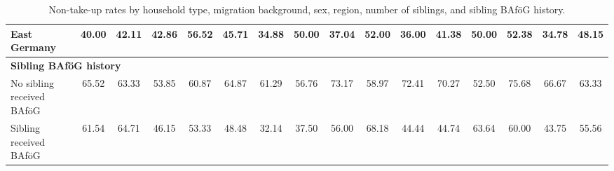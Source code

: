 \begin{landscape}
\begin{table}[H]
\begin{tabular}{lccccccccccccccc}
East Germany & 40.00 & 42.11 & 42.86 & 56.52 & 45.71 & 34.88 & 50.00 & 37.04 & 52.00 & 36.00 & 41.38 & 50.00 & 52.38 & 34.78 & 48.15 \\
\midrule
\multicolumn{16}{l}{\textbf{Sibling BAföG history}} \\
No sibling received BAföG & 65.52 & 63.33 & 53.85 & 60.87 & 64.87 & 61.29 & 56.76 & 73.17 & 58.97 & 72.41 & 70.27 & 52.50 & 75.68 & 66.67 & 63.33 \\
Sibling received BAföG    & 61.54 & 64.71 & 46.15 & 53.33 & 48.48 & 32.14 & 37.50 & 56.00 & 68.18 & 44.44 & 44.74 & 63.64 & 60.00 & 43.75 & 55.56 \\
\bottomrule
\end{tabular}
\caption{Non-take-up rates by household type, migration background, sex, region, number of siblings, and sibling BAföG history.}
\label{table:take-up-rates-grouped}
\end{table}
\end{landscape}


